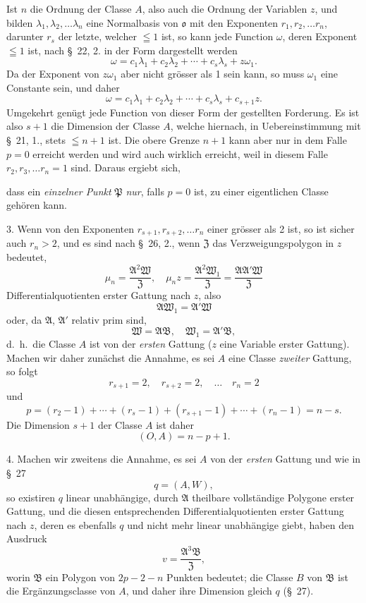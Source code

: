 \documentclass{article}
\begin{document}
Ist $n$ die Ordnung der Classe $A$, also auch die Ordnung der Variablen $z$, und bilden $\lambda_{1}, \lambda_{2}, \ldots \lambda_{n}$ eine Normalbasis von $\mathfrak{o}$ mit den Exponenten $r_{1}, r_{2}, \ldots r_{n}$, darunter $r_{s}$ der letzte, welcher $\leqq 1$ ist, so kann jede Function $\omega$, deren Exponent $\leqq 1$ ist, nach §~22, 2. in der Form dargestellt werden
\[ \omega = c_{1}\lambda_{1} + c_{2}\lambda_{2} + \cdots + c_{s}\lambda_{s} + z\omega_{1}. \]
Da der Exponent von $z\omega_{1}$ aber nicht grösser als 1 sein kann, so muss $\omega_{1}$ eine Constante sein, und daher
\[ \omega = c_{1}\lambda_{1} + c_{2}\lambda_{2} + \cdots + c_{s}\lambda_{s} + c_{s+1}z. \]
Umgekehrt genügt jede Function von dieser Form der gestellten Forderung. Es ist also $s+1$ die Dimension der Classe $A$, welche hiernach, in Uebereinstimmung mit §~21, 1., stets $\leqq n+1$ ist. Die obere Grenze $n+1$ kann aber nur in dem Falle $p = 0$ erreicht werden und wird auch wirklich erreicht, weil in diesem Falle $r_{2}, r_{3}, \ldots r_{n} = 1$ sind. Daraus ergiebt sich,

dass ein \emph{einzelner Punkt} $\mathfrak{P}$ \emph{nur}, falls $p = 0$ ist, zu einer eigentlichen Classe gehören kann.

3. Wenn von den Exponenten $r_{s+1}, r_{s+2}, \ldots r_{n}$ einer grösser als 2 ist, so ist sicher auch $r_{n} > 2$, und es sind nach §~26, 2., wenn $\mathfrak{Z}$ das Verzweigungspolygon in $z$ bedeutet,
\[ \mu_{n} = \frac{\mathfrak{A}^{2}\mathfrak{W}}{\mathfrak{Z}}, \quad \mu_{n}z = \frac{\mathfrak{A}^{2}\mathfrak{W}_{1}}{\mathfrak{Z}} = \frac{\mathfrak{A}\mathfrak{A}'\mathfrak{W}}{\mathfrak{Z}} \]
Differentialquotienten erster Gattung nach $z$, also
\[ \mathfrak{A}\mathfrak{W}_{1} = \mathfrak{A}'\mathfrak{W} \]
oder, da $\mathfrak{A}$, $\mathfrak{A}'$ relativ prim sind,
\[ \mathfrak{W} = \mathfrak{A}\mathfrak{B}, \quad \mathfrak{W}_{1} = \mathfrak{A}'\mathfrak{B}, \]
d.\ h.\ die Classe $A$ ist von der \emph{ersten} Gattung ($z$ eine Variable erster Gattung). Machen wir daher zunächst die Annahme, es sei $A$ eine Classe \emph{zweiter} Gattung, so folgt
\[ r_{s+1} = 2, \quad r_{s+2} = 2, \quad \ldots \quad r_{n} = 2 \]
und
\[ p = (r_{2}-1) + \cdots + (r_{s}-1) + (r_{s+1}-1) + \cdots + (r_{n}-1) = n-s. \]
Die Dimension $s+1$ der Classe $A$ ist daher
\[ (O, A) = n-p+1. \]

4. Machen wir zweitens die Annahme, es sei $A$ von der \emph{ersten} Gattung und wie in §~27
\[ q = (A, W), \]
so existiren $q$ linear unabhängige, durch $\mathfrak{A}$ theilbare vollständige Polygone erster Gattung, und die diesen entsprechenden Differentialquotienten erster Gattung nach $z$, deren es ebenfalls $q$ und nicht mehr linear unabhängige giebt, haben den Ausdruck
\[ v = \frac{\mathfrak{A}^{3}\mathfrak{B}}{\mathfrak{Z}}, \]
worin $\mathfrak{B}$ ein Polygon von $2p-2-n$ Punkten bedeutet; die Classe $B$ von $\mathfrak{B}$ ist die Ergänzungsclasse von $A$, und daher ihre Dimension gleich $q$ (§~27).
\end{document}
